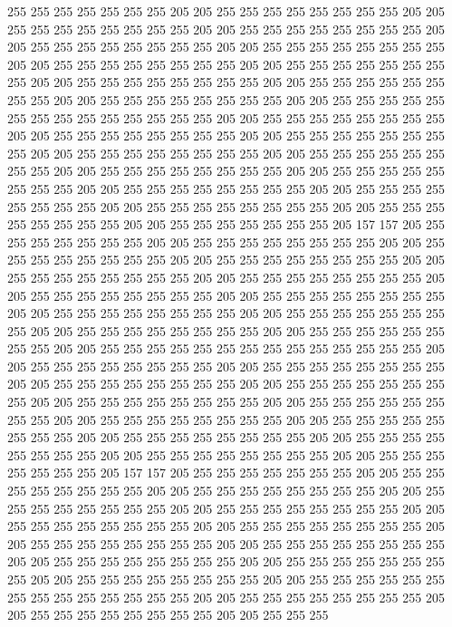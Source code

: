 255 255 255 255 255 255 255 205 205 255 255 255 255 255 255 255 255 205 205 255
255 255 255 255 255 255 255 205 205 255 255 255 255 255 255 255 255 205 205 255
255 255 255 255 255 255 255 205 205 255 255 255 255 255 255 255 255 205 205 255
255 255 255 255 255 255 255 205 205 255 255 255 255 255 255 255 255 205 205 255
255 255 255 255 255 255 255 205 205 255 255 255 255 255 255 255 255 205 205 255
255 255 255 255 255 255 255 205 205 255 255 255 255 255 255 255 255 255 255 255
255 255 255 205 205 255 255 255 255 255 255 255 255 205 205 255 255 255 255 255
255 255 255 205 205 255 255 255 255 255 255 255 255 205 205 255 255 255 255 255
255 255 255 205 205 255 255 255 255 255 255 255 255 205 205 255 255 255 255 255
255 255 255 205 205 255 255 255 255 255 255 255 255 205 205 255 255 255 255 255
255 255 255 205 205 255 255 255 255 255 255 255 255 205 205 255 255 255 255 255
255 255 255 205 205 255 255 255 255 255 255 255 255 205 205 255 255 255 255 255
255 255 205 157 157 205 255 255 255 255 255 255 255 205 205 255 255 255 255 255
255 255 255 205 205 255 255 255 255 255 255 255 255 205 205 255 255 255 255 255
255 255 255 205 205 255 255 255 255 255 255 255 255 205 205 255 255 255 255 255
255 255 255 205 205 255 255 255 255 255 255 255 255 205 205 255 255 255 255 255
255 255 255 205 205 255 255 255 255 255 255 255 255 205 205 255 255 255 255 255
255 255 255 205 205 255 255 255 255 255 255 255 255 205 205 255 255 255 255 255
255 255 255 205 205 255 255 255 255 255 255 255 255 255 255 255 255 255 255 205
205 255 255 255 255 255 255 255 255 205 205 255 255 255 255 255 255 255 255 205
205 255 255 255 255 255 255 255 255 205 205 255 255 255 255 255 255 255 255 205
205 255 255 255 255 255 255 255 255 205 205 255 255 255 255 255 255 255 255 205
205 255 255 255 255 255 255 255 255 205 205 255 255 255 255 255 255 255 255 205
205 255 255 255 255 255 255 255 255 205 205 255 255 255 255 255 255 255 255 205
205 255 255 255 255 255 255 255 255 205 205 255 255 255 255 255 255 255 205 157
157 205 255 255 255 255 255 255 255 205 205 255 255 255 255 255 255 255 255 205
205 255 255 255 255 255 255 255 255 205 205 255 255 255 255 255 255 255 255 205
205 255 255 255 255 255 255 255 255 205 205 255 255 255 255 255 255 255 255 205
205 255 255 255 255 255 255 255 255 205 205 255 255 255 255 255 255 255 255 205
205 255 255 255 255 255 255 255 255 205 205 255 255 255 255 255 255 255 255 205
205 255 255 255 255 255 255 255 255 205 205 255 255 255 255 255 255 255 255 205
205 255 255 255 255 255 255 255 255 255 255 255 255 255 255 205 205 255 255 255
255 255 255 255 255 205 205 255 255 255 255 255 255 255 255 205 205 255 255 255
